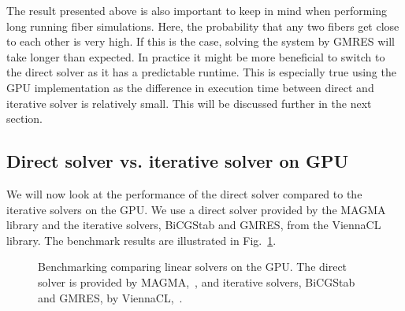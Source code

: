 The result presented above is also important to keep in mind when performing long running fiber simulations. Here, the probability that any two fibers get close to each other is very high. If this is the case, solving the system by GMRES will take longer than expected. In practice it might be more beneficial to switch to the direct solver as it has a predictable runtime. This is especially true using the GPU implementation as the difference in execution time between direct and iterative solver is relatively small. This will be discussed further in the next section.

\subsection{Direct solver vs. iterative solver on GPU}

We will now look at the performance of the direct solver compared to the iterative solvers on the GPU. We use a direct solver provided by the MAGMA library and the iterative solvers, BiCGStab and GMRES, from the ViennaCL library. The benchmark results are illustrated in Fig.~\ref{fig:bench_cuda_solvers}.

\begin{figure}[htbp]
  \centering
  \caption[Benchmark linear solvers on GPU.]{Benchmarking comparing linear solvers on the GPU. The direct solver is provided by MAGMA,~\cite{MagmaDocumentation}, and iterative solvers, BiCGStab and GMRES, by ViennaCL,~\cite{ViennaCLRupp2010}.}
  \label{fig:bench_cuda_solvers}
\end{figure}


